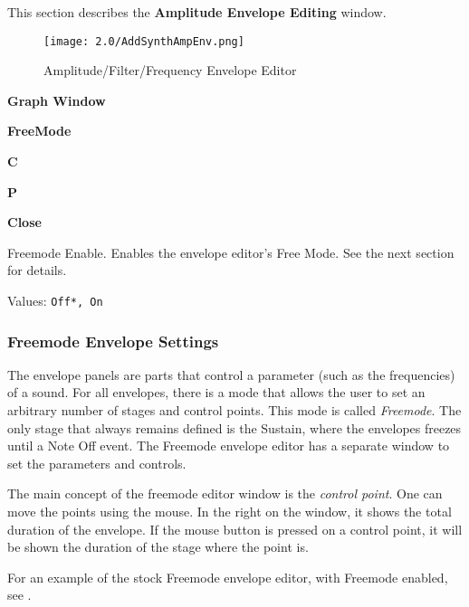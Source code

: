    This section describes the \textbf{Amplitude Envelope Editing} window.

\begin{figure}[H]
   \centering
   \texttt{[image: 2.0/AddSynthAmpEnv.png]}
   \caption{Amplitude/Filter/Frequency Envelope Editor}
   \label{fig:amplitude_envelope_editor}
\end{figure}

   \begin{enumber}
      \item \textbf{Graph Window}
      \item \textbf{FreeMode}
      \item \textbf{C}
      \item \textbf{P}
      \item \textbf{Close}
   \end{enumber}

   \setcounter{ItemCounter}{0}      %

   Freemode Enable.
   Enables the envelope editor's Free Mode.
   See the next section for details.

   Values: \texttt{Off*, On} \\

\subsubsection{Freemode Envelope Settings}
\label{subsubsec:freemode_envelope_settings}

   The envelope panels are parts that control a parameter (such as the
   frequencies) of a sound.  For all envelopes, there is a mode that allows the
   user to set an arbitrary number of stages and control points. This mode is
   called \textsl{Freemode}.  The only stage that always remains defined is the
   Sustain, where the envelopes freezes until a Note Off event.  The Freemode
   envelope editor has a separate window to set the parameters and controls.

   The main concept of the freemode editor window is the
   \textsl{control point}.
   One can move the points using the mouse. In the right on the
   window, it shows the total duration of the envelope. If the mouse button
   is pressed on a control point, it will be shown the duration of the
   stage where the point is.

   For an example of the stock Freemode envelope editor, with
   Freemode enabled, see .

